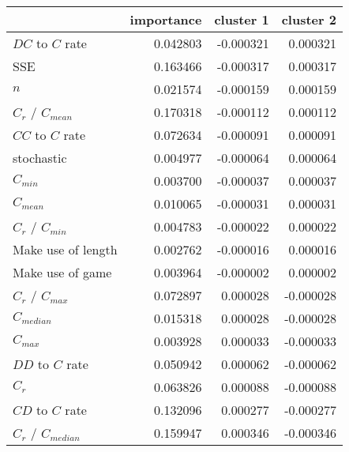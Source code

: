 \begin{tabular}{lrrr}
\toprule
{} &  importance &  cluster 1 &  cluster 2 \\
\midrule
$DC$ to $C$ rate     &    0.042803 &  -0.000321 &   0.000321 \\
SSE                  &    0.163466 &  -0.000317 &   0.000317 \\
$n$                  &    0.021574 &  -0.000159 &   0.000159 \\
$C_r$ / $C_{mean}$   &    0.170318 &  -0.000112 &   0.000112 \\
$CC$ to $C$ rate     &    0.072634 &  -0.000091 &   0.000091 \\
stochastic           &    0.004977 &  -0.000064 &   0.000064 \\
$C_{min}$            &    0.003700 &  -0.000037 &   0.000037 \\
$C_{mean}$           &    0.010065 &  -0.000031 &   0.000031 \\
$C_r$ / $C_{min}$    &    0.004783 &  -0.000022 &   0.000022 \\
Make use of length   &    0.002762 &  -0.000016 &   0.000016 \\
Make use of game     &    0.003964 &  -0.000002 &   0.000002 \\
$C_r$ / $C_{max}$    &    0.072897 &   0.000028 &  -0.000028 \\
$C_{median}$         &    0.015318 &   0.000028 &  -0.000028 \\
$C_{max}$            &    0.003928 &   0.000033 &  -0.000033 \\
$DD$ to $C$ rate     &    0.050942 &   0.000062 &  -0.000062 \\
$C_r$                &    0.063826 &   0.000088 &  -0.000088 \\
$CD$ to $C$ rate     &    0.132096 &   0.000277 &  -0.000277 \\
$C_r$ / $C_{median}$ &    0.159947 &   0.000346 &  -0.000346 \\
\bottomrule
\end{tabular}
